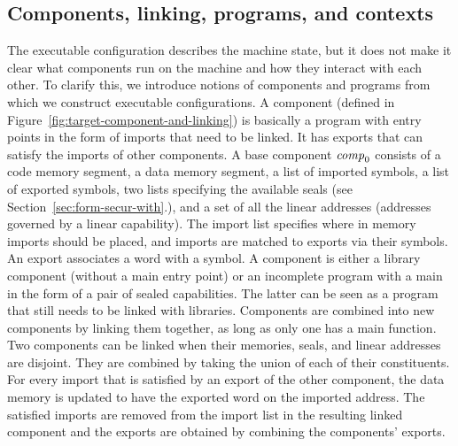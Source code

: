 \documentclass[acmsmall,screen]{acmart}\settopmatter{}
\renewcommand{\comp}{\var{comp}}
\begin{document}
\subsection{Components, linking, programs, and contexts }
\label{subsec:components-linking}
The executable configuration describes the machine state, but it does not make it clear what components run on the machine and how they interact with each other.
To clarify this, we introduce notions of components and programs from which we construct executable configurations.
A component (defined in Figure~\ref{fig:target-component-and-linking}) is basically a program with entry points in the form of imports that need to be linked.
It has exports that can satisfy the imports of other components.
A base component $\comp_0$ consists of a code memory segment, a data memory segment, a list of imported symbols, a list of exported symbols, two lists specifying the available seals (see Section~\ref{sec:form-secur-with}.), and a set of all the linear addresses (addresses governed by a linear capability).
The import list specifies where in memory imports should be placed, and imports are matched to exports via their symbols.
An export associates a word with a symbol.
A component is either a library component (without a main entry point) or an incomplete program with a main in the form of a pair of sealed capabilities.
The latter can be seen as a program that still needs to be linked with libraries.
Components are combined into new components by linking them together, as long as only one has a main function.
Two components can be linked when their memories, seals, and linear addresses are disjoint.
They are combined by taking the union of each of their constituents.
For every import that is satisfied by an export of the other component, the data memory is updated to have the exported word on the imported address.
The satisfied imports are removed from the import list in the resulting linked component and the exports are obtained by combining the components' exports.
\end{document}
